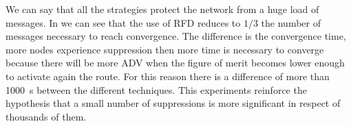 We can say that all the strategies protect the network from a huge load of messages.
In  we can see that the use of \ac{RFD}
reduces to $1/3$ the number of messages necessary to reach convergence.
The difference is the convergence time, more nodes experience suppression
then more time is necessary to converge because there will be more \ac{ADV} when
the figure of merit becomes lower enough to activate again the route.
For this reason there is a difference of more than \SI{1000}{\second} between
the different techniques.
This experiments reinforce the hypothesis that a small number of suppressions is
more significant in respect of thousands of them.

